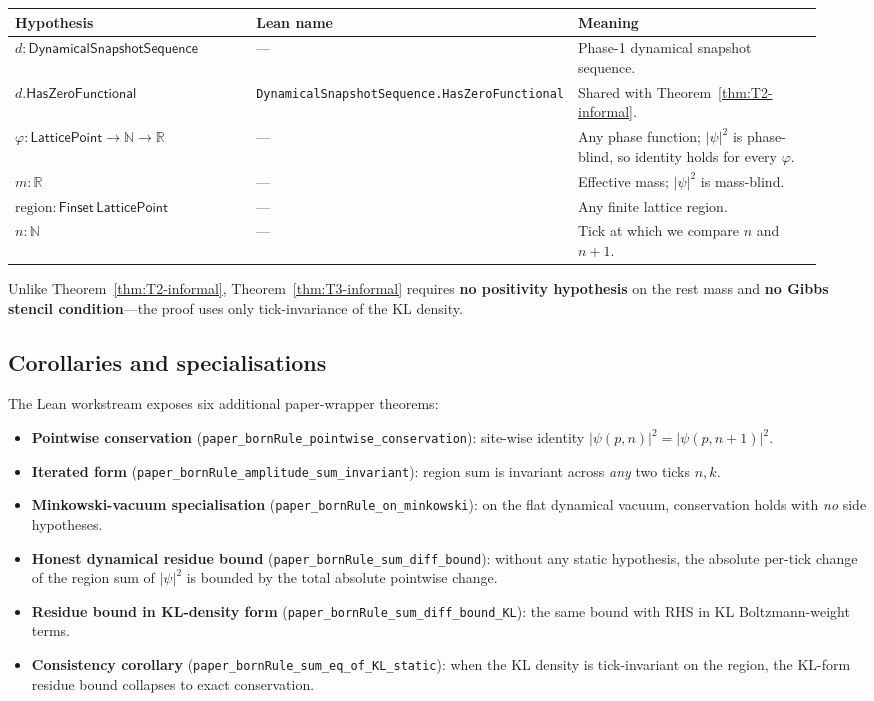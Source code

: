 \documentclass[11pt,a4paper,twoside]{article}
\theoremstyle{definition}
\newcommand{\Rbb}{\mathbb{R}}
\newcommand{\Nbb}{\mathbb{N}}
\newcommand{\HasZF}{\mathsf{HasZeroFunctional}}
\newcommand{\DynSeq}{\mathsf{DynamicalSnapshotSequence}}
\newcommand{\code}[1]{\texttt{#1}}
\begin{document}
\begin{longtable}{@{}p{0.32\linewidth} p{0.26\linewidth} p{0.36\linewidth}@{}}
\toprule
Hypothesis & Lean name & Meaning \\
\midrule
\endhead
$d:\DynSeq$ & --- & Phase-1 dynamical snapshot sequence. \\
$d.\HasZF$ & \code{DynamicalSnapshotSequence.HasZeroFunctional} & Shared with Theorem~\ref{thm:T2-informal}. \\
$\varphi:\mathsf{LatticePoint}\to\Nbb\to\Rbb$ & --- & Any phase function; $|\psi|^{2}$ is phase-blind, so identity holds for every $\varphi$. \\
$m:\Rbb$ & --- & Effective mass; $|\psi|^{2}$ is mass-blind. \\
$\mathrm{region}:\mathsf{Finset}\,\mathsf{LatticePoint}$ & --- & Any finite lattice region. \\
$n:\Nbb$ & --- & Tick at which we compare $n$ and $n+1$. \\
\bottomrule
\end{longtable}

\noindent Unlike Theorem~\ref{thm:T2-informal},
Theorem~\ref{thm:T3-informal} requires \textbf{no positivity
hypothesis} on the rest mass and \textbf{no Gibbs stencil
condition}---the proof uses only tick-invariance of the KL density.

\subsection{Corollaries and specialisations}\label{sec:born-coroll}

The Lean workstream exposes six additional paper-wrapper theorems:
\begin{itemize}
\item \textbf{Pointwise conservation}
  (\code{paper\_bornRule\_pointwise\_conservation}): site-wise
  identity $|\psi(p,n)|^{2}=|\psi(p,n{+}1)|^{2}$.
\item \textbf{Iterated form}
  (\code{paper\_bornRule\_amplitude\_sum\_invariant}): region sum is
  invariant across \emph{any} two ticks $n,k$.
\item \textbf{Minkowski-vacuum specialisation}
  (\code{paper\_bornRule\_on\_minkowski}): on the flat dynamical
  vacuum, conservation holds with \emph{no} side hypotheses.
\item \textbf{Honest dynamical residue bound}
  (\code{paper\_bornRule\_sum\_diff\_bound}): without any static
  hypothesis, the absolute per-tick change of the region sum of
  $|\psi|^{2}$ is bounded by the total absolute pointwise change.
\item \textbf{Residue bound in KL-density form}
  (\code{paper\_bornRule\_sum\_diff\_bound\_KL}): the same bound with
  RHS in KL Boltzmann-weight terms.
\item \textbf{Consistency corollary}
  (\code{paper\_bornRule\_sum\_eq\_of\_KL\_static}): when the KL
  density is tick-invariant on the region, the KL-form residue bound
  collapses to exact conservation.
\end{itemize}
\end{document}
